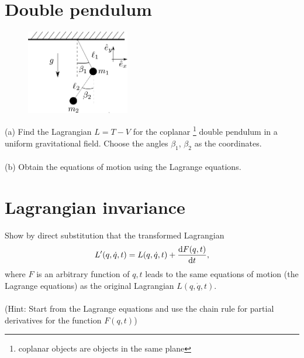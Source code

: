 \documentclass{article}
\begin{document}
    \section{Double pendulum}
        \begin{figure}
            \vspace{-1cm}
            \includegraphics[width=0.4\textwidth]{figures/figure_2.pdf}
            \vspace{-2cm}
        \end{figure}
        (a) Find the Lagrangian $L = T - V$ for the coplanar \footnote{coplanar objects are objects in the same plane} double pendulum in a uniform gravitational field. Choose the angles $\beta_1$, $\beta_2$ as the coordinates. \\ \\
        (b) Obtain the equations of motion using the Lagrange equations.

    \section{Lagrangian invariance}
        Show by direct substitution that the transformed Lagrangian
        \begin{equation*}
            L'(q, \dot q, t) = L(q, \dot q, t) + \dv{F(q, t)}{t},
        \end{equation*}
        where $F$ is an arbitrary function of $q, t$ leads to the same equations of motion (the Lagrange equations) as the original Lagrangian $L(q, \dot q, t)$.\\  \\
        (Hint: Start from the Lagrange equations and use the chain rule for partial derivatives for the function $F(q, t)$)
\end{document}
